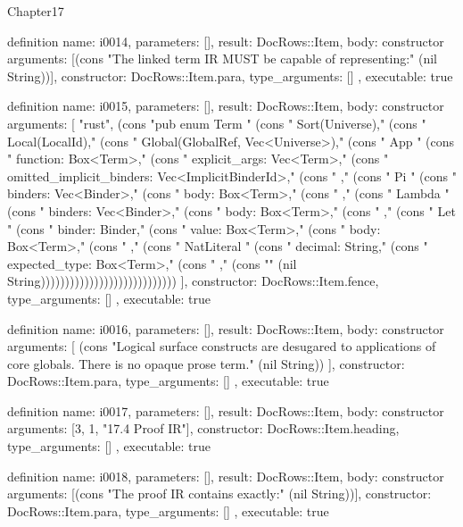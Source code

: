 \begin{lexlean}{Chapter17}
\begin{semanticmodule}
definition{
  name: i0014,
  parameters: [],
  result: DocRows::Item,
  body: constructor{
    arguments: [(cons "The linked term IR MUST be capable of representing:" (nil String))],
    constructor: DocRows::Item.para,
    type_arguments: []
  },
  executable: true
}

definition{
  name: i0015,
  parameters: [],
  result: DocRows::Item,
  body: constructor{
    arguments: [
      "rust",
      (cons "pub enum Term {" (cons "    Sort(Universe)," (cons "    Local(LocalId)," (cons "    Global(GlobalRef, Vec<Universe>)," (cons "    App {" (cons "        function: Box<Term>," (cons "        explicit_args: Vec<Term>," (cons "        omitted_implicit_binders: Vec<ImplicitBinderId>," (cons "    }," (cons "    Pi {" (cons "        binders: Vec<Binder>," (cons "        body: Box<Term>," (cons "    }," (cons "    Lambda {" (cons "        binders: Vec<Binder>," (cons "        body: Box<Term>," (cons "    }," (cons "    Let {" (cons "        binder: Binder," (cons "        value: Box<Term>," (cons "        body: Box<Term>," (cons "    }," (cons "    NatLiteral {" (cons "        decimal: String," (cons "        expected_type: Box<Term>," (cons "    }," (cons "}" (nil String))))))))))))))))))))))))))))
    ],
    constructor: DocRows::Item.fence,
    type_arguments: []
  },
  executable: true
}

definition{
  name: i0016,
  parameters: [],
  result: DocRows::Item,
  body: constructor{
    arguments: [
      (cons "Logical surface constructs are desugared to applications of core globals. There is no opaque prose term." (nil String))
    ],
    constructor: DocRows::Item.para,
    type_arguments: []
  },
  executable: true
}

definition{
  name: i0017,
  parameters: [],
  result: DocRows::Item,
  body: constructor{
    arguments: [3, 1, "17.4 Proof IR"],
    constructor: DocRows::Item.heading,
    type_arguments: []
  },
  executable: true
}

definition{
  name: i0018,
  parameters: [],
  result: DocRows::Item,
  body: constructor{
    arguments: [(cons "The proof IR contains exactly:" (nil String))],
    constructor: DocRows::Item.para,
    type_arguments: []
  },
  executable: true
}


\end{semanticmodule}
\end{lexlean}
